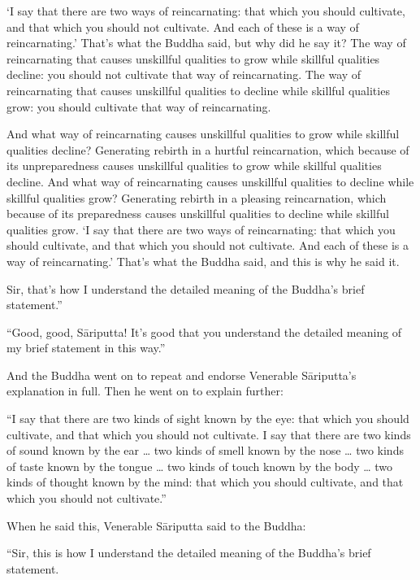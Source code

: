 \documentclass[12pt,openany]{book}%
\begin{document}
‘I say that there are two ways of reincarnating: that which you should cultivate, and that which you should not cultivate. And each of these is a way of reincarnating.’ That’s what the Buddha said, but why did he say it? The way of reincarnating that causes unskillful qualities to grow while skillful qualities decline: you should not cultivate that way of reincarnating. The way of reincarnating that causes unskillful qualities to decline while skillful qualities grow: you should cultivate that way of reincarnating. 

And what way of reincarnating causes unskillful qualities to grow while skillful qualities decline? Generating rebirth in a hurtful reincarnation, which because of its unpreparedness causes unskillful qualities to grow while skillful qualities decline. And what way of reincarnating causes unskillful qualities to decline while skillful qualities grow? Generating rebirth in a pleasing reincarnation, which because of its preparedness causes unskillful qualities to decline while skillful qualities grow. ‘I say that there are two ways of reincarnating: that which you should cultivate, and that which you should not cultivate. And each of these is a way of reincarnating.’ That’s what the Buddha said, and this is why he said it. 

Sir, that’s how I understand the detailed meaning of the Buddha’s brief statement.” 

“Good, good, \textsanskrit{Sāriputta}! It’s good that you understand the detailed meaning of my brief statement in this way.” 

And the Buddha went on to repeat and endorse Venerable \textsanskrit{Sāriputta}’s explanation in full. Then he went on to explain further: 

“I say that there are two kinds of sight known by the eye: that which you should cultivate, and that which you should not cultivate. I say that there are two kinds of sound known by the ear … two kinds of smell known by the nose … two kinds of taste known by the tongue … two kinds of touch known by the body … two kinds of thought known by the mind: that which you should cultivate, and that which you should not cultivate.” 

When he said this, Venerable \textsanskrit{Sāriputta} said to the Buddha: 

“Sir, this is how I understand the detailed meaning of the Buddha’s brief statement. 
\end{document}
